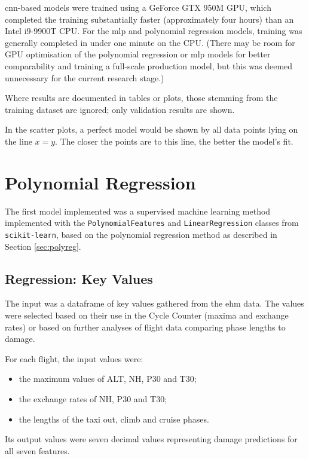 \ac{cnn}-based models were trained using a GeForce GTX 950M GPU, which completed the training substantially faster (approximately four hours) than an Intel i9-9900T CPU. For the \ac{mlp} and polynomial regression models, training was generally completed in under one minute on the CPU. (There may be room for GPU optimisation of the polynomial regression or \ac{mlp} models for better comparability and training a full-scale production model, but this was deemed unnecessary for the current research stage.)

Where results are documented in tables or plots, those stemming from the training dataset are ignored; only validation results are shown.

In the scatter plots, a perfect model would be shown by all data points lying on the line \(x = y\). The closer the points are to this line, the better the model's fit.

\section{Polynomial Regression} \label{sec:model:polyreg}
The first model implemented was a supervised machine learning method implemented with the \texttt{PolynomialFeatures} and \texttt{LinearRegression} classes from \texttt{scikit-learn}, based on the polynomial regression method as described in Section \ref{sec:polyreg}.

\subsection{Regression: Key Values} \label{sec:model:polyreg:kvs}
The input was a dataframe of key values gathered from the \ac{ehm} data. The values were selected based on their use in the Cycle Counter (maxima and exchange rates) or based on further analyses of flight data comparing phase lengths to damage.

For each flight, the input values were:

\begin{itemize}
    \item the maximum values of ALT, NH, P30 and T30;
    \item the exchange rates of NH, P30 and T30;
    \item the lengths of the taxi out, climb and cruise phases.
\end{itemize}

Its output values were seven decimal values representing damage predictions for all seven features.

